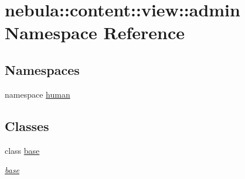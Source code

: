 \hypertarget{namespacenebula_1_1content_1_1view_1_1admin}{
\section{nebula::content::view::admin Namespace Reference}
\label{namespacenebula_1_1content_1_1view_1_1admin}
}
\subsection*{Namespaces}
\begin{DoxyCompactItemize}
\item 
namespace \hyperlink{namespacenebula_1_1content_1_1view_1_1admin_1_1human}{human}
\end{DoxyCompactItemize}
\subsection*{Classes}
\begin{DoxyCompactItemize}
\item 
class \hyperlink{classnebula_1_1content_1_1view_1_1admin_1_1base}{base}
\begin{DoxyCompactList}\small\item\em \hyperlink{classnebula_1_1content_1_1view_1_1admin_1_1base}{base} \item\end{DoxyCompactList}\end{DoxyCompactItemize}
